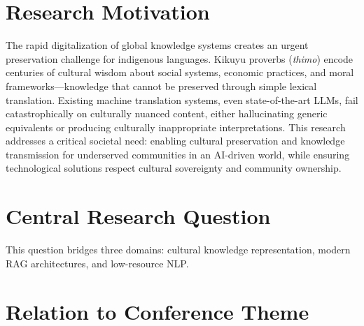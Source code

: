 \documentclass[11pt,a4paper]{article}
\begin{document}
\section*{Research Motivation}

The rapid digitalization of global knowledge systems creates an urgent preservation challenge for indigenous languages. Kikuyu proverbs (\emph{thimo}) encode centuries of cultural wisdom about social systems, economic practices, and moral frameworks---knowledge that cannot be preserved through simple lexical translation. Existing machine translation systems, even state-of-the-art LLMs, fail catastrophically on culturally nuanced content, either hallucinating generic equivalents or producing culturally inappropriate interpretations. This research addresses a critical societal need: enabling cultural preservation and knowledge transmission for underserved communities in an AI-driven world, while ensuring technological solutions respect cultural sovereignty and community ownership.

\vspace{10pt}

\section*{Central Research Question}

\begin{center}
\end{center}
\vspace{5pt}

\noindent This question bridges three domains: cultural knowledge representation, modern RAG architectures, and low-resource NLP.

\newpage

\section*{Relation to Conference Theme}
\end{document}
